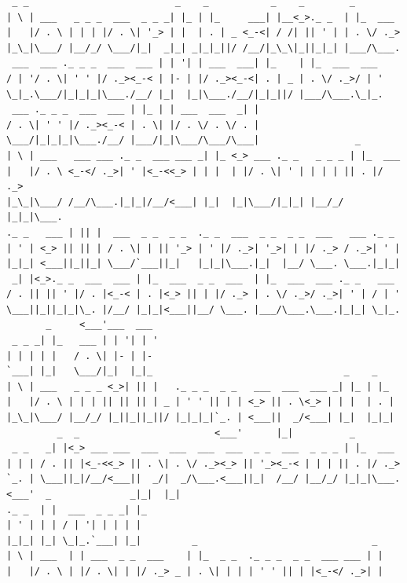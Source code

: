 \begin{verbatim}
 _ _                          _    _           _    _        _         
| \ | ___   _ _ _  ___  _ _ _| |_ | |_     ___| |__<_>._ _  | |_  ___  
|   |/ . \ | | | |/ . \| '_> | |  | . | _ <_-<| / /| || ' | | . \/ ._> 
|_\_|\___/ |__/_/ \___/|_|  _|_| _|_|_||/ /__/|_\_\|_||_|_| |___/\___. 
 ___  ___ ._ _ _  ___  ___ | | '| | ___  ___| |_    | |_  ___  ___     
/ | '/ . \| ' ' |/ ._><_-< | |- | |/ ._><_-<| . | _ | . \/ ._>/ | '    
\_|_.\___/|_|_|_|\___./__/ |_|  |_|\___./__/|_|_||/ |___/\___.\_|_.    
 ___ ._ _ _  ___  ___ | |_ | | ___  ___  _| |                          
/ . \| ' ' |/ ._><_-< | . \| |/ . \/ . \/ . |                          
\___/|_|_|_|\___./__/ |___/|_|\___/\___/\___|                 _        
| \ | ___   ___ ___ ._ _  ___ ___ _| |_ <_> ___ ._ _   _ _ _ | |_  ___ 
|   |/ . \ <_-</ ._>| ' |<_-<<_> | | |  | |/ . \| ' | | | | || . |/ ._>
|_\_|\___/ /__/\___.|_|_|/__/<___| |_|  |_|\___/|_|_| |__/_/ |_|_|\___.
._ _   ___ | || |  ___  _ _  _ _  ._ _  ___  _ _  _ _  ___   ___ ._ _  
| ' | <_> || || | / . \| | || '_> | ' |/ ._>| '_>| | |/ ._> / ._>| ' | 
|_|_| <___||_||_| \___/`___||_|   |_|_|\___.|_|  |__/ \___. \___.|_|_| 
 _| |<_>._ _  ___  ___ | |_  ___  _ _  ___  | |_  ___  ___ ._ _   ___  
/ . || || ' |/ . |<_-< | . |<_> || | |/ ._> | . \/ ._>/ ._>| ' | / | ' 
\___||_||_|_|\_. |/__/ |_|_|<___||__/ \___. |___/\___.\___.|_|_| \_|_. 
       _     <___'___  ___                                             
 _ _ _| |_   ___ | | '| | '                                            
| | | | |   / . \| |- | |-                                             
`___| |_|   \___/|_|  |_|_                                  _    _     
| \ | ___   _ _ _ <_>| || |   ._ _ _  _ _   ___  ___  ___ _| |_ | |_   
|   |/ . \ | | | || || || | _ | ' ' || | | <_> || . \<_> | | |  | . |  
|_\_|\___/ |__/_/ |_||_||_||/ |_|_|_|`_. | <___||  _/<___| |_|  |_|_|  
         _  _                        <___'      |_|          _         
 _ _   _| |<_> ___ ___  ___  ___  ___  ___  _ _  ___  _ _ _ | |_  ___  
| | | / . || |<_-<<_> || . \| . \/ ._><_> || '_><_-< | | | || . |/ ._> 
`_. | \___||_|/__/<___||  _/|  _/\___.<___||_|  /__/ |__/_/ |_|_|\___. 
<___'  _              _|_|  |_|                                        
._ _  | |  ___  _ _ _| |_                                              
| ' | | | / | '| | | | |                                               
|_|_| |_| \_|_.`___| |_|         _                               _     
| \ | ___  | | ___  _ _  ___    | |_  _ _  ._ _ _  _ _  ___ ___ | |    
|   |/ . \ | |/ . \| | |/ ._> _ | . \| | | | ' ' || | |<_-</ ._>| |    

\end{verbatim}
